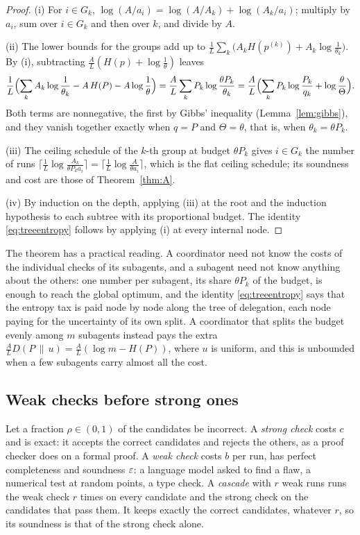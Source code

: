 \begin{proof}
(i) For $i\in G_{k}$, $\log(A/a_{i})=\log(A/A_{k})+\log(A_{k}/a_{i})$; multiply by $a_{i}$, sum over $i\in G_{k}$ and then over $k$, and divide by $A$.

(ii) The lower bounds for the groups add up to $\frac1L\sum_{k}\bigl(A_{k}H(p^{(k)})+A_{k}\log\frac1{\theta_{k}}\bigr)$. By (i), subtracting $\frac AL(H(p)+\log\frac1\theta)$ leaves
\[
\frac1L\Bigl(\sum_{k}A_{k}\log\frac1{\theta_{k}}-A\,H(P)-A\log\frac1\theta\Bigr)=\frac AL\sum_{k}P_{k}\log\frac{\theta P_{k}}{\theta_{k}}=\frac AL\Bigl(\sum_{k}P_{k}\log\frac{P_{k}}{q_{k}}+\log\frac\theta\Theta\Bigr).
\]
Both terms are nonnegative, the first by Gibbs' inequality (Lemma~\ref{lem:gibbs}), and they vanish together exactly when $q=P$ and $\Theta=\theta$, that is, when $\theta_{k}=\theta P_{k}$.

(iii) The ceiling schedule of the $k$-th group at budget $\theta P_{k}$ gives $i\in G_{k}$ the number of runs $\lceil\frac1L\log\frac{A_{k}}{\theta P_{k}a_{i}}\rceil=\lceil\frac1L\log\frac{A}{\theta a_{i}}\rceil$, which is the flat ceiling schedule; its soundness and cost are those of Theorem~\ref{thm:A}.

(iv) By induction on the depth, applying (iii) at the root and the induction hypothesis to each subtree with its proportional budget. The identity \eqref{eq:treeentropy} follows by applying (i) at every internal node.
\end{proof}

The theorem has a practical reading. A coordinator need not know the costs of the individual checks of its subagents, and a subagent need not know anything about the others: one number per subagent, its share $\theta P_{k}$ of the budget, is enough to reach the global optimum, and the identity \eqref{eq:treeentropy} says that the entropy tax is paid node by node along the tree of delegation, each node paying for the uncertainty of its own split. A coordinator that splits the budget evenly among $m$ subagents instead pays the extra $\frac AL D(P\,\|\,u)=\frac AL(\log m-H(P))$, where $u$ is uniform, and this is unbounded when a few subagents carry almost all the cost.

\subsection{Weak checks before strong ones}

Let a fraction $\rho\in(0,1)$ of the candidates be incorrect. A \emph{strong check} costs $c$ and is exact: it accepts the correct candidates and rejects the others, as a proof checker does on a formal proof. A \emph{weak check} costs $b$ per run, has perfect completeness and soundness $\varepsilon$: a language model asked to find a flaw, a numerical test at random points, a type check. A \emph{cascade} with $r$ weak runs runs the weak check $r$ times on every candidate and the strong check on the candidates that pass them. It keeps exactly the correct candidates, whatever $r$, so its soundness is that of the strong check alone.

